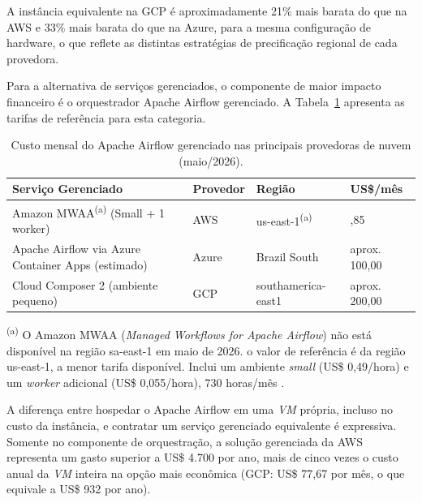 A instância equivalente na GCP é aproximadamente 21\% mais barata do que na AWS e
33\% mais barata do que na Azure, para a mesma configuração de hardware, o que
reflete as distintas estratégias de precificação regional de cada provedora.

Para a alternativa de serviços gerenciados, o componente de maior impacto financeiro
é o orquestrador Apache Airflow gerenciado. A Tabela~\ref{tab:custo_airflow}
apresenta as tarifas de referência para esta categoria.

\begin{table}[H]
    \centering
    \small
    \setlength{\extrarowheight}{3pt}
    \renewcommand{\arraystretch}{1.3}
    \begin{tabular}{
        >{\raggedright\arraybackslash}p{5.0cm}
        >{\centering\arraybackslash}p{1.8cm}
        >{\raggedright\arraybackslash}p{3.6cm}
        >{\centering\arraybackslash}p{2.2cm}
    }
        \toprule
        \textbf{Serviço Gerenciado} & \textbf{Provedor} & \textbf{Região} &
        \textbf{US\$/mês} \\
        \midrule
        \rowcolor[gray]{0.96}
        Amazon MWAA\textsuperscript{(a)} (Small + 1 worker) &
        AWS & us-east-1\textsuperscript{(a)} & 397,85 \\
        Apache Airflow via Azure Container Apps (estimado) &
        Azure & Brazil South & aprox. 100,00 \\
        \rowcolor[gray]{0.96}
        Cloud Composer 2 (ambiente pequeno) &
        GCP & southamerica-east1 & aprox. 200,00 \\
        \bottomrule
    \end{tabular}
    \caption{Custo mensal do Apache Airflow gerenciado nas principais provedoras de
    nuvem (maio/2026).}
    \label{tab:custo_airflow}
\end{table}

{\footnotesize \textsuperscript{(a)} O Amazon MWAA (\textit{Managed Workflows for
Apache Airflow}) não está disponível na região sa-east-1 em maio de 2026.
o valor de referência é da região us-east-1, a menor tarifa disponível.
Inclui um ambiente \textit{small} (US\$ 0,49/hora) e um \textit{worker} adicional
(US\$ 0,055/hora), 730 horas/mês \cite[]{aws2026pricing}.}

\medskip

A diferença entre hospedar o Apache Airflow em uma \textit{VM} própria, incluso no custo
da instância, e contratar um serviço gerenciado equivalente é expressiva. Somente
no componente de orquestração, a solução gerenciada da AWS representa um gasto
superior a US\$ 4.700 por ano, mais de cinco vezes o custo anual da \textit{VM} inteira
na opção mais econômica (GCP: US\$ 77,67 por mês, o que equivale a US\$ 932 por ano).

